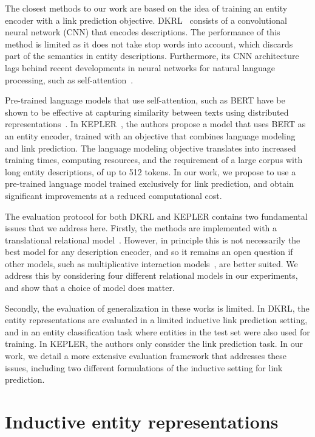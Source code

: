 \documentclass[sigconf]{acmart}
\begin{document}
The closest methods to our work are based on the idea of training an entity encoder with a link prediction objective. DKRL~\cite{xie2016RepresentationLO} consists of a convolutional neural network (CNN) that encodes descriptions. The performance of this method is limited as it does not take stop words into account, which discards part of the semantics in entity descriptions. Furthermore, its CNN architecture lags behind recent developments in neural networks for natural language processing, such as self-attention~\cite{vaswani2017attention}.

Pre-trained language models that use self-attention, such as BERT \citep{devlin2019bert} have be shown to be effective at capturing similarity between texts using distributed representations~\citep{reimers2019sentence,petroni2019zero}. In KEPLER~\cite{wang2019kepler}, the authors propose a model that uses BERT as an entity encoder, trained with an objective that combines language modeling and link prediction. The language modeling objective translates into increased training times, computing resources, and the requirement of a large corpus with long entity descriptions, of up to 512 tokens. In our work, we propose to use a pre-trained language model trained exclusively for link prediction, and obtain significant improvements at a reduced computational cost.

The evaluation protocol for both DKRL and KEPLER contains two fundamental issues that we address here. Firstly, the methods are implemented with a translational relational model~\cite{bordes2013translating}. However, in principle this is not necessarily the best model for any description encoder, and so it remains an open question if other models, such as multiplicative interaction models~\citep{yang2015embedding,trouillon2016complex}, are better suited. We address this by considering four different relational models in our experiments, and show that a choice of model does matter.

Secondly, the evaluation of generalization in these works is limited. In DKRL, the entity representations are evaluated in a limited inductive link prediction setting, and in an entity classification task where entities in the test set were also used for training. In KEPLER, the authors only consider the link prediction task. In our work, we detail a more extensive evaluation framework that addresses these issues, including two different formulations of the inductive setting for link prediction.

\section{Inductive entity representations}\label{sec:inductive}
\end{document}
